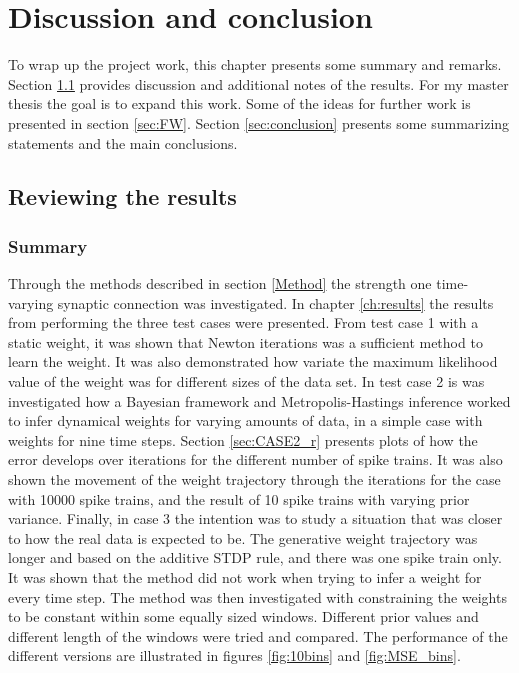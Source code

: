 
\chapter{Discussion and conclusion}
\label{ch:6}

To wrap up the project work, this chapter presents some summary and remarks. Section \ref{sec:review} provides discussion and additional notes of the results. For my master thesis the goal is to expand this work. Some of the ideas for further work is presented in section \ref{sec:FW}. Section \ref{sec:conclusion} presents some summarizing statements and the main conclusions.  

\section{Reviewing the results}
\label{sec:review}
\subsection{Summary}
Through the methods described in section \ref{Method} the strength one time-varying synaptic connection was investigated. In chapter \ref{ch:results} the results from performing the three test cases were presented. From test case 1 with a static weight, it was shown that Newton iterations was a sufficient method to learn the weight. It was also demonstrated how variate the maximum likelihood value of the weight was for different sizes of the data set. In test case 2 is was investigated how a Bayesian framework and Metropolis-Hastings inference worked to infer dynamical weights for varying amounts of data, in a simple case with weights for nine time steps. Section \ref{sec:CASE2_r} presents plots of how the error develops over iterations for the different number of spike trains. It was also shown the movement of the weight trajectory through the iterations for the case with 10000 spike trains, and the result of 10 spike trains with varying prior variance. Finally, in case 3 the intention was to study a situation that was closer to how the real data is expected to be. The generative weight trajectory was longer and based on the additive STDP rule, and there was one spike train only. It was shown that the method did not work when trying to infer a weight for every time step. The method was then investigated with constraining the weights to be constant within some equally sized windows. Different prior values and different length of the windows were tried and compared. The performance of the different versions are illustrated in figures \ref{fig:10bins} and \ref{fig:MSE_bins}. 

